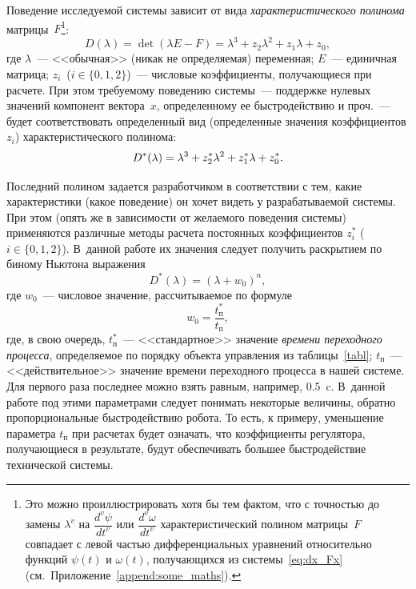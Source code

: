 \documentclass[12pt,a4paper,openany]{extarticle}
\begin{document}
Поведение исследуемой системы зависит от вида \textit{характеристического полинома} матрицы~$F$\footnote{Это можно проиллюстрировать хотя бы тем фактом, что с точностью до замены $\lambda^v$ на $\dfrac{d^v\psi}{dt^v}$ или $\dfrac{d^v\omega}{dt^v}$ характеристический полином матрицы~$F$ совпадает с левой частью дифференциальных уравнений относительно функций $\psi(t)$ и $\omega(t)$, получающихся из системы~\eqref{eq:dx_Fx} (см.~Приложение~\ref{append:some_maths}).}:
\begin{equation}
	D(\lambda) = \det(\lambda E - F) = \lambda^3 + z_{2}\lambda^{2} + z_{1}\lambda + z_0,
\end{equation}
где $\lambda$~--- <<обычная>> (никак не определяемая) переменная; $E$~--- единичная матрица; $z_i$~($i\in\{0,1,2\}$)~--- числовые коэффициенты, получающиеся при расчете.
При этом требуемому поведению системы~--- поддержке нулевых значений компонент вектора~$x$, определенному ее быстродействию и проч.~--- будет соответствовать определенный вид (определенные значения коэффициентов $z_i$) характеристического полинома:
\begin{equation}\label{poly_needed}
	D^*(\lambda) = \lambda^3 + z^*_2\lambda^2 + z_1^*\lambda + z^*_0\ldotp
\end{equation}

Последний полином задается разработчиком в соответствии с тем, какие характеристики (какое поведение) он хочет видеть у разрабатываемой системы.
При этом (опять же в зависимости от желаемого поведения системы) применяются различные методы расчета постоянных коэффициентов $z^*_i$ ($i\in\{0,1,2\}$).
В~данной работе их значения следует получить раскрытием по биному Ньютона выражения
\begin{equation}\label{poly's}
	D^*(\lambda) = (\lambda+w_0)^n\!\!,
\end{equation}
где $w_0$~--- числовое значение, рассчитываемое по формуле
\begin{equation}
	w_0 = \frac{t^*_\text{п}}{t_\text{п}},
\end{equation}
где, в свою очередь,  $t_\text{п}^*$~--- <<стандартное>> значение \textit{времени переходного процесса}, определяемое по порядку объекта управления  из таблицы~\ref{tabl};  $t_\text{п}$~--- <<действительное>> значение времени переходного процесса в нашей системе.
Для первого раза последнее можно взять равным, например, $0.5$~c.
В~данной работе под этими параметрами следует понимать некоторые величины, обратно пропорциональные быстродействию робота.
То есть, к примеру, уменьшение параметра $t_\text{п}$ при расчетах будет означать, что коэффициенты регулятора, получающиеся в результате, будут обеспечивать большее быстродействие технической системы.
\end{document}
